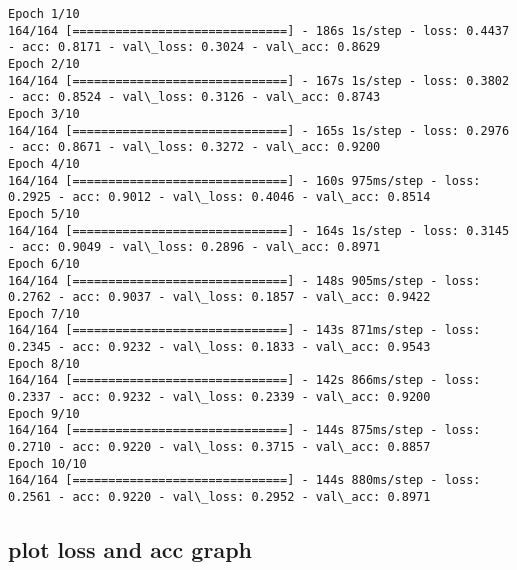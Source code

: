 \documentclass[11pt]{article}
\begin{document}
    \begin{Verbatim}[commandchars=\\\{\}]
Epoch 1/10
164/164 [==============================] - 186s 1s/step - loss: 0.4437 - acc: 0.8171 - val\_loss: 0.3024 - val\_acc: 0.8629
Epoch 2/10
164/164 [==============================] - 167s 1s/step - loss: 0.3802 - acc: 0.8524 - val\_loss: 0.3126 - val\_acc: 0.8743
Epoch 3/10
164/164 [==============================] - 165s 1s/step - loss: 0.2976 - acc: 0.8671 - val\_loss: 0.3272 - val\_acc: 0.9200
Epoch 4/10
164/164 [==============================] - 160s 975ms/step - loss: 0.2925 - acc: 0.9012 - val\_loss: 0.4046 - val\_acc: 0.8514
Epoch 5/10
164/164 [==============================] - 164s 1s/step - loss: 0.3145 - acc: 0.9049 - val\_loss: 0.2896 - val\_acc: 0.8971
Epoch 6/10
164/164 [==============================] - 148s 905ms/step - loss: 0.2762 - acc: 0.9037 - val\_loss: 0.1857 - val\_acc: 0.9422
Epoch 7/10
164/164 [==============================] - 143s 871ms/step - loss: 0.2345 - acc: 0.9232 - val\_loss: 0.1833 - val\_acc: 0.9543
Epoch 8/10
164/164 [==============================] - 142s 866ms/step - loss: 0.2337 - acc: 0.9232 - val\_loss: 0.2339 - val\_acc: 0.9200
Epoch 9/10
164/164 [==============================] - 144s 875ms/step - loss: 0.2710 - acc: 0.9220 - val\_loss: 0.3715 - val\_acc: 0.8857
Epoch 10/10
164/164 [==============================] - 144s 880ms/step - loss: 0.2561 - acc: 0.9220 - val\_loss: 0.2952 - val\_acc: 0.8971

    \end{Verbatim}

    \hypertarget{plot-loss-and-acc-graph}{%
\subsection{plot loss and acc graph}\label{plot-loss-and-acc-graph}}
\end{document}

